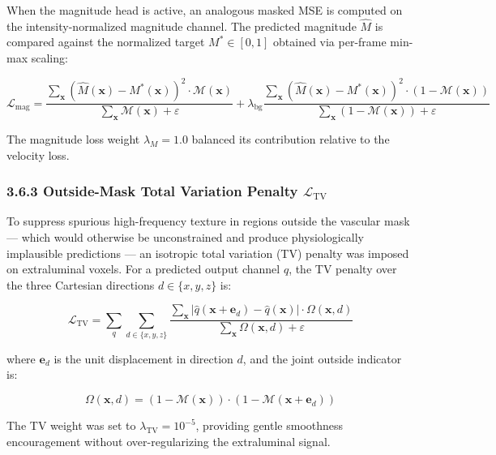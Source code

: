 When the magnitude head is active, an analogous masked MSE is computed on the intensity-normalized magnitude channel. The predicted magnitude $\hat{M}$ is compared against the normalized target $M^* \in [0, 1]$ obtained via per-frame min-max scaling:

\begin{equation}
    \mathcal{L}_{\text{mag}} =
        \frac{\sum_{\mathbf{x}} \left(\hat{M}(\mathbf{x}) - M^*(\mathbf{x})\right)^2 \cdot \mathcal{M}(\mathbf{x})}{\sum_{\mathbf{x}} \mathcal{M}(\mathbf{x}) + \varepsilon}
        + \lambda_{\text{bg}}
        \frac{\sum_{\mathbf{x}} \left(\hat{M}(\mathbf{x}) - M^*(\mathbf{x})\right)^2 \cdot (1-\mathcal{M}(\mathbf{x}))}{\sum_{\mathbf{x}} (1-\mathcal{M}(\mathbf{x})) + \varepsilon}
\end{equation}

The magnitude loss weight $\lambda_M = 1.0$ balanced its contribution relative to the velocity loss.

\subsubsection*{3.6.3 Outside-Mask Total Variation Penalty $\mathcal{L}_{\text{TV}}$}

To suppress spurious high-frequency texture in regions outside the vascular mask --- which would otherwise be unconstrained and produce physiologically implausible predictions --- an isotropic total variation (TV) penalty \cite{rudin1992tv,liu2019tvdip} was imposed on extraluminal voxels. For a predicted output channel $\hat{q}$, the TV penalty over the three Cartesian directions $d \in \{x, y, z\}$ is:

\begin{equation}
    \mathcal{L}_{\text{TV}} = \sum_{q} \sum_{d \in \{x,y,z\}} \frac{\sum_{\mathbf{x}} \left|\hat{q}(\mathbf{x} + \mathbf{e}_d) - \hat{q}(\mathbf{x})\right| \cdot \Omega(\mathbf{x}, d)}{\sum_{\mathbf{x}} \Omega(\mathbf{x}, d) + \varepsilon}
\end{equation}

where $\mathbf{e}_d$ is the unit displacement in direction $d$, and the joint outside indicator is:

\begin{equation}
    \Omega(\mathbf{x}, d) = \left(1 - \mathcal{M}(\mathbf{x})\right) \cdot \left(1 - \mathcal{M}(\mathbf{x} + \mathbf{e}_d)\right)
\end{equation}

The TV weight was set to $\lambda_{\text{TV}} = 10^{-5}$, providing gentle smoothness encouragement without over-regularizing the extraluminal signal.

